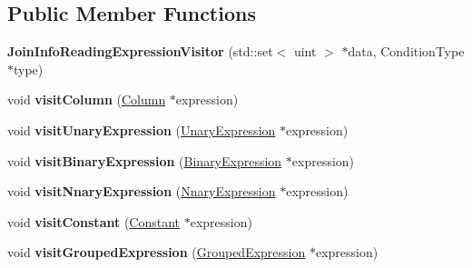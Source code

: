 \subsection*{Public Member Functions}
\begin{DoxyCompactItemize}
\item 
\hypertarget{class_join_info_reading_expression_visitor_a272a690d4b6ec6528a91f5ac0caae887}{{\bfseries Join\+Info\+Reading\+Expression\+Visitor} (std\+::set$<$ uint $>$ $\ast$data, Condition\+Type $\ast$type)}\label{class_join_info_reading_expression_visitor_a272a690d4b6ec6528a91f5ac0caae887}

\item 
\hypertarget{class_join_info_reading_expression_visitor_a03c3ec1bc690b6d9dc66a97efa75f2be}{void {\bfseries visit\+Column} (\hyperlink{class_column}{Column} $\ast$expression)}\label{class_join_info_reading_expression_visitor_a03c3ec1bc690b6d9dc66a97efa75f2be}

\item 
\hypertarget{class_join_info_reading_expression_visitor_a2254ead29d9226c771b530f43b677bd0}{void {\bfseries visit\+Unary\+Expression} (\hyperlink{class_unary_expression}{Unary\+Expression} $\ast$expression)}\label{class_join_info_reading_expression_visitor_a2254ead29d9226c771b530f43b677bd0}

\item 
\hypertarget{class_join_info_reading_expression_visitor_a6c6326b1ca8218ed35ac86ab7d487a0e}{void {\bfseries visit\+Binary\+Expression} (\hyperlink{class_binary_expression}{Binary\+Expression} $\ast$expression)}\label{class_join_info_reading_expression_visitor_a6c6326b1ca8218ed35ac86ab7d487a0e}

\item 
\hypertarget{class_join_info_reading_expression_visitor_a81cdbded017bc5e294b014122b94391c}{void {\bfseries visit\+Nnary\+Expression} (\hyperlink{class_nnary_expression}{Nnary\+Expression} $\ast$expression)}\label{class_join_info_reading_expression_visitor_a81cdbded017bc5e294b014122b94391c}

\item 
\hypertarget{class_join_info_reading_expression_visitor_a5d94ca3c0172aeaf3436fd15f3d9ba35}{void {\bfseries visit\+Constant} (\hyperlink{class_constant}{Constant} $\ast$expression)}\label{class_join_info_reading_expression_visitor_a5d94ca3c0172aeaf3436fd15f3d9ba35}

\item 
\hypertarget{class_join_info_reading_expression_visitor_af727a4e4a952f05080c8659ce0cff208}{void {\bfseries visit\+Grouped\+Expression} (\hyperlink{class_grouped_expression}{Grouped\+Expression} $\ast$expression)}\label{class_join_info_reading_expression_visitor_af727a4e4a952f05080c8659ce0cff208}

\end{DoxyCompactItemize}
